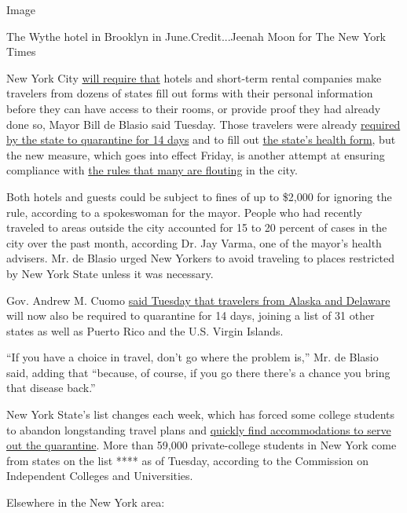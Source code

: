 Image

The Wythe hotel in Brooklyn in June.Credit...Jeenah Moon for The New
York Times

New York City
\href{https://twitter.com/NYCMayorCounsel/status/1295754462049509377}{will
require that} hotels and short-term rental companies make travelers from
dozens of states fill out forms with their personal information before
they can have access to their rooms, or provide proof they had already
done so, Mayor Bill de Blasio said Tuesday. Those travelers were already
\href{https://coronavirus.health.ny.gov/covid-19-travel-advisory}{required
by the state to quarantine for 14 days} and to fill out
\href{https://forms.ny.gov/s3/Welcome-to-New-York-State-Traveler-Health-Form}{the
state's health form}, but the new measure, which goes into effect
Friday, is another attempt at ensuring compliance with
\href{https://www.nytimes3xbfgragh.onion/2020/08/16/nyregion/coronavirus-quarantine-nyc.html}{the
rules that many are flouting} in the city.

Both hotels and guests could be subject to fines of up to \$2,000 for
ignoring the rule, according to a spokeswoman for the mayor. People who
had recently traveled to areas outside the city accounted for 15 to 20
percent of cases in the city over the past month, according Dr. Jay
Varma, one of the mayor's health advisers. Mr. de Blasio urged New
Yorkers to avoid traveling to places restricted by New York State unless
it was necessary.

Gov. Andrew M. Cuomo
\href{https://twitter.com/NYGovCuomo/status/1295781030457221121}{said
Tuesday that travelers from Alaska and Delaware} will now also be
required to quarantine for 14 days, joining a list of 31 other states as
well as Puerto Rico and the U.S. Virgin Islands.

``If you have a choice in travel, don't go where the problem is,'' Mr.
de Blasio said, adding that ``because, of course, if you go there
there's a chance you bring that disease back.''

New York State's list changes each week, which has forced some college
students to abandon longstanding travel plans and
\href{https://www.nytimes3xbfgragh.onion/2020/08/18/nyregion/college-reopening-quarantine-coronavirus.html}{quickly
find accommodations to serve out the quarantine}. More than 59,000
private-college students in New York come from states on the list ****
as of Tuesday, according to the Commission on Independent Colleges and
Universities.

Elsewhere in the New York area:

